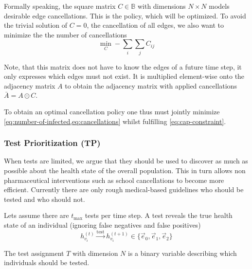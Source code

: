 Formally speaking, the square matrix $C \in \mathbb{B}$ with dimensions $N \times N$ models desirable edge cancellations.
This is the policy, which will be optimized.
To avoid the trivial solution of $C=0$, the cancellation of all edges, we also want to minimize the the number of cancellations
\begin{equation}\label{eq:cancellations}
	\min_{C} -\sum_i \sum_j C_{ij}
\end{equation}

Note, that this matrix does not have to know the edges of a future time step, it only expresses which edges must not exist.
It is multiplied element-wise onto the adjacency matrix $A$ to obtain the adjacency matrix with applied cancellations $\bar{A} = A \odot C$.


To obtain an optimal cancellation policy one thus must jointly minimize \cref{eq:number-of-infected,eq:cancellations} whilst fulfilling \cref{eq:cap-constraint}.

\subsubsection{Test Prioritization (TP)}
When tests are limited, we argue that they should be used to discover as much as possible about the health state of the overall population.
This in turn allows non pharmaceutical interventions such as school cancellations to become more efficient.
Currently there are only rough medical-based guidelines who should be tested and who should not.

Lets assume there are $t_{\text{max}}$ tests per time step.
A test reveals the true health state of an individual (ignoring false negatives and false positives)
\begin{equation}
h_{{v}_i}^{(t)} \xrightarrow{\text{test}} h_{{v}_i}^{(t+1)} \in \{\vec{e}_0, \vec{e}_1, \vec{e}_2 \}
\end{equation}

The test assignment $T$ with dimension $N$ is a binary variable describing which individuals should be tested.